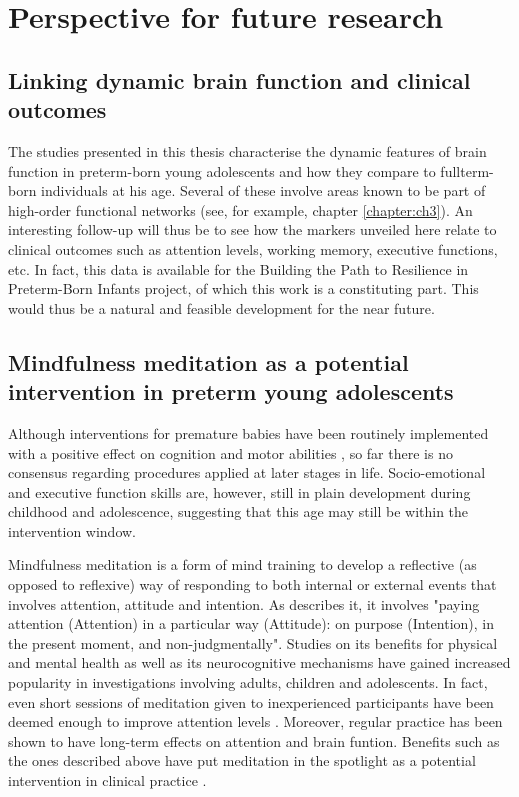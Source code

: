 \section{Perspective for future research}


\subsection*{Linking dynamic brain function and clinical outcomes}
The studies presented in this thesis characterise the dynamic features of brain function in preterm-born young adolescents and how they compare to fullterm-born individuals at his age. Several of these involve areas known to be part of high-order functional networks (see, for example, chapter \ref{chapter:ch3}). An interesting follow-up will thus be to see how the markers unveiled here relate to clinical outcomes such as attention levels, working memory, executive functions, etc. In fact, this data is available for the Building the Path to Resilience in Preterm-Born Infants project, of which this work is a constituting part. This would thus be a natural and feasible development for the near future.

\subsection*{Mindfulness meditation as a potential intervention in preterm young adolescents}

 Although interventions for premature babies have been routinely implemented with a positive effect on cognition and  motor abilities \citep{Ferreira2020}, so far there is no consensus regarding procedures applied at later stages in life. Socio-emotional and executive function skills are, however, still in plain development during childhood and adolescence, suggesting that this age may still be within the intervention window.


Mindfulness meditation is a form of mind training to develop a reflective (as opposed to reflexive) way of responding to both internal or external events \citep{Bishop2004} that involves attention, attitude and intention. As \citep{Kabat-Zinn1994} describes it, it involves "paying attention (Attention) in a particular way (Attitude): on purpose (Intention), in the present moment, and non-judgmentally". Studies on its benefits for physical and mental health as well as its neurocognitive mechanisms have gained increased popularity in investigations involving adults, children and adolescents. In fact, even short sessions of meditation given to inexperienced participants have been deemed enough to improve attention levels \citet{Norris2018, Jankowski2020}. Moreover, regular practice has been shown to have long-term effects on attention \citep{Zanesco2018} and brain funtion. Benefits such as the ones described above have put meditation in the spotlight as a potential intervention in clinical practice \citep{Simkin2014,Zhang2018}.

